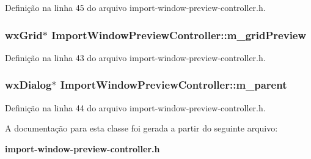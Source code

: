 Definição na linha 45 do arquivo import-\/window-\/preview-\/controller.\+h.

\subsubsection[{m\+\_\+grid\+Preview}]{\setlength{\rightskip}{0pt plus 5cm}wx\+Grid$\ast$ Import\+Window\+Preview\+Controller\+::m\+\_\+grid\+Preview\hspace{0.3cm}{\ttfamily [protected]}}\label{class_import_window_preview_controller_a46dc49784cf1dcfec7ecc0dcc3c53139}


Definição na linha 43 do arquivo import-\/window-\/preview-\/controller.\+h.

\subsubsection[{m\+\_\+parent}]{\setlength{\rightskip}{0pt plus 5cm}wx\+Dialog$\ast$ Import\+Window\+Preview\+Controller\+::m\+\_\+parent\hspace{0.3cm}{\ttfamily [protected]}}\label{class_import_window_preview_controller_aba55e83cce2c8f218d46751953749ba2}


Definição na linha 44 do arquivo import-\/window-\/preview-\/controller.\+h.



A documentação para esta classe foi gerada a partir do seguinte arquivo\+:\begin{DoxyCompactItemize}
\item 
{\bf import-\/window-\/preview-\/controller.\+h}\end{DoxyCompactItemize}
